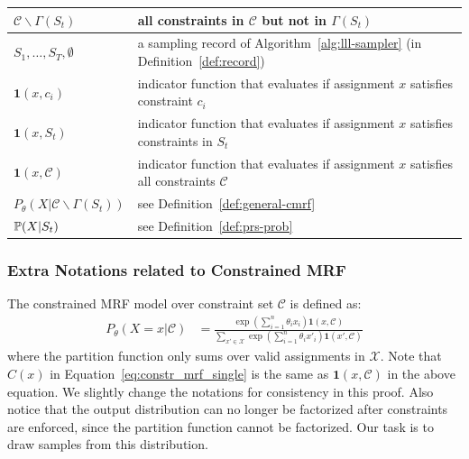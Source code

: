 \begin{table}[!t]
\begin{tabular}{ll}
        $\mathcal{C}\backslash \Gamma(S_t)$              & all constraints in $\mathcal{C}$ but not in $\Gamma(S_t)$                                    \\
        \hline
        $S_1,\ldots,S_{T},\emptyset$                     & a sampling record of Algorithm~\ref{alg:lll-sampler}  (in Definition~\ref{def:record})       \\
        \hline
        $\mathbf{1}(x,c_i)$                              & indicator function that evaluates if    assignment $x$ satisfies constraint $c_i$            \\
        \hline
        $\mathbf{1}(x,S_t)$                              & indicator function that evaluates if assignment $x$ satisfies constraints in $S_t$           \\
        \hline
        $\mathbf{1}(x,\mathcal{C})$                      & indicator function that evaluates if  assignment $x$ satisfies all constraints $\mathcal{C}$ \\
        \hline
        $P_{\theta}(X|\mathcal{C}\backslash\Gamma(S_t))$ & see Definition~\ref{def:general-cmrf}                                                        \\
        \hline
        $\mathbb{P}(X|S_t)$                                      & see Definition~\ref{def:prs-prob}                                                            \\
        \hline
    \end{tabular}
\end{table}

\subsubsection*{Extra Notations related to Constrained MRF}
The constrained MRF model over constraint set $\mathcal{C}$ is defined as:
\begin{align*}
    P_{\theta}(X=x|\mathcal{C}) & =\frac{\exp(\sum_{i=1}^n\theta_i x_i)\mathbf{1}(x,\mathcal{C})}{\sum_{x'\in\mathcal{X}}\exp(\sum_{i=1}^n\theta_i x'_i)\mathbf{1}(x',\mathcal{C})}
\end{align*}
where the partition function only sums over valid assignments in $\mathcal{X}$. Note that $C(x)$ in Equation~\eqref{eq:constr_mrf_single} is the same as $\mathbf{1}(x,\mathcal{C})$ in the above equation. We slightly change the notations for consistency in this proof. Also notice that the output distribution can no longer be factorized after constraints are enforced, since the partition function cannot be factorized. Our task is to draw samples from this distribution.

